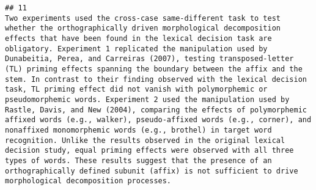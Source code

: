 \documentclass[
  english,
  man]{apa6}
\begin{document}
\begin{verbatim}
## 11                                                                                                                                                                                                                                                                                                                                                                                                                                                                                                                                                                                                                                                                                                                                                                                                                                                                                                                                                                                                                                                                                                                                                                                                                                                                                                                                                                                                                                                                                                                                           Two experiments used the cross-case same-different task to test whether the orthographically driven morphological decomposition effects that have been found in the lexical decision task are obligatory. Experiment 1 replicated the manipulation used by Dunabeitia, Perea, and Carreiras (2007), testing transposed-letter (TL) priming effects spanning the boundary between the affix and the stem. In contrast to their finding observed with the lexical decision task, TL priming effect did not vanish with polymorphemic or pseudomorphemic words. Experiment 2 used the manipulation used by Rastle, Davis, and New (2004), comparing the effects of polymorphemic affixed words (e.g., walker), pseudo-affixed words (e.g., corner), and nonaffixed monomorphemic words (e.g., brothel) in target word recognition. Unlike the results observed in the original lexical decision study, equal priming effects were observed with all three types of words. These results suggest that the presence of an orthographically defined subunit (affix) is not sufficient to drive morphological decomposition processes.

\end{verbatim}
\end{document}
